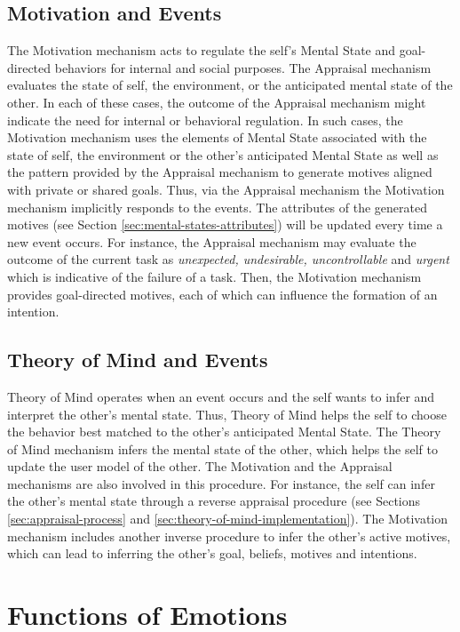 \documentclass[12pt]{report}
\begin{document}
\subsection{Motivation and Events}
The Motivation mechanism acts to regulate the self's Mental State and
goal-directed behaviors for internal and social purposes. The Appraisal mechanism
evaluates the state of self, the environment, or the anticipated mental state of
the other. In each of these cases, the outcome of the Appraisal mechanism might
indicate the need for internal or behavioral regulation. In such cases, the
Motivation mechanism uses the elements of Mental State associated with the state
of self, the environment or the other's anticipated Mental State as well as the
pattern provided by the Appraisal mechanism to generate motives aligned with
private or shared goals. Thus, via the Appraisal mechanism the Motivation
mechanism implicitly responds to the events. The attributes of the generated
motives (see Section \ref{sec:mental-states-attributes}) will be updated every
time a new event occurs. For instance, the Appraisal mechanism may evaluate the
outcome of the current task as \textit{unexpected, undesirable, uncontrollable}
and \textit{urgent} which is indicative of the failure of a task. Then, the
Motivation mechanism provides goal-directed motives, each of which can
influence the formation of an intention. 

\subsection{Theory of Mind and Events}
Theory of Mind operates when an event occurs and the self wants to infer and
interpret the other's mental state. Thus, Theory of Mind helps the self to
choose the behavior best matched to the other's anticipated Mental State.
The Theory of Mind mechanism infers the mental state of the other, which helps
the self to update the user model of the other. The Motivation and the Appraisal
mechanisms are also involved in this procedure. For instance, the self can infer
the other's mental state through a reverse appraisal procedure (see Sections
\ref{sec:appraisal-process} and \ref{sec:theory-of-mind-implementation}). The
Motivation mechanism includes another inverse procedure to infer the other's
active motives, which can lead to inferring the other's goal, beliefs, motives
and intentions.

\section{Functions of Emotions}
\label{sec:emotion-functions}
\end{document}
